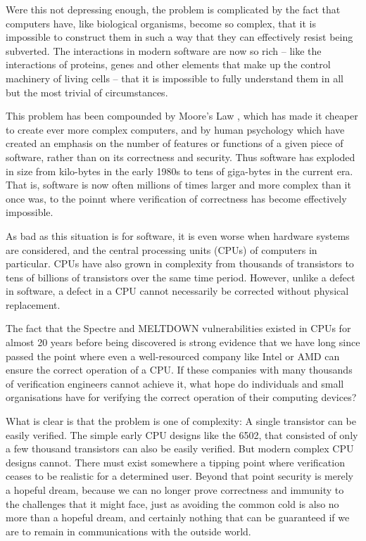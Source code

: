 
Were this not depressing enough, the problem is complicated by the fact that computers have, like biological organisms,
become so complex, that it is impossible to construct them in such a way that they can effectively resist being subverted.
The interactions in modern software are now so rich -- like the interactions of proteins, genes and other elements that make up
the control machinery of living cells -- that it is impossible to fully understand them in all but the most trivial of circumstances.

This problem has been compounded by Moore's Law , which has made it cheaper to create ever more complex computers, and
by human psychology which have created an emphasis on the number of features or functions of a given piece of software, rather than
on its correctness and security.  Thus software has exploded in size from kilo-bytes in the early 1980s to tens of giga-bytes in
the current era. That is, software is now often millions of times larger and more complex than it once was, to the poinnt where
verification of correctness has become effectively impossible.

As bad as this situation is for software, it is even worse when hardware systems are considered, and the central processing units
(CPUs) of computers in particular.  CPUs have also grown in complexity from thousands of transistors to tens of billions of transistors
over the same time period.  However, unlike a defect in software, a defect in a CPU cannot necessarily be corrected without physical
replacement.

The fact that the Spectre and MELTDOWN vulnerabilities existed in CPUs for almost 20 years before being discovered 
is strong evidence that we have long since passed the point where even a well-resourced company like Intel or AMD can ensure
the correct operation of a CPU.  If these companies with many thousands of verification engineers cannot achieve it,
what hope do individuals and small organisations have for verifying the correct operation of their computing devices?

What is clear is that the problem is one of complexity: A single transistor can be easily verified. The simple early CPU designs
like the 6502, that consisted of only a few thousand transistors can also be easily verified.  But modern complex CPU designs cannot.
There must exist somewhere a tipping point where verification ceases to be realistic for a determined user.
Beyond that point security is merely a hopeful dream, because we can no longer prove correctness and immunity to the challenges
that it might face, just as avoiding the common cold is also no more than a hopeful dream, and certainly nothing that can
be guaranteed if we are to remain in communications with the outside world.

